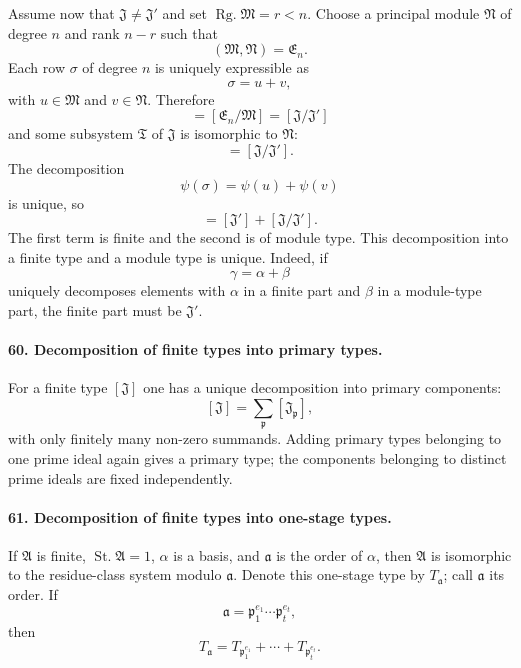 \documentclass[11pt]{article}
\newcommand{\Rg}{\operatorname{Rg.}}
\newcommand{\St}{\operatorname{St.}}
\begin{document}
Assume now that $\mathfrak J\ne\mathfrak J'$ and set $\Rg\mathfrak M=r<n$. Choose a principal module $\mathfrak N$ of degree $n$ and rank $n-r$ such that
\begin{equation}
  (\mathfrak M,\mathfrak N)=\mathfrak E_n.
\tag{99}
\end{equation}
Each row $\sigma$ of degree $n$ is uniquely expressible as
\begin{equation}
  \sigma=u+v,
\tag{100}
\end{equation}
with $u\in\mathfrak M$ and $v\in\mathfrak N$. Therefore
\begin{equation}
  [\mathfrak N]=[\mathfrak E_n/\mathfrak M]=[\mathfrak J/\mathfrak J']
\tag{101}
\end{equation}
and some subsystem $\mathfrak T$ of $\mathfrak J$ is isomorphic to $\mathfrak N$:
\begin{equation}
  [\mathfrak T]=[\mathfrak J/\mathfrak J'].
\tag{102}
\end{equation}
The decomposition
\begin{equation}
  \psi(\sigma)=\psi(u)+\psi(v)
\tag{103}
\end{equation}
is unique, so
\begin{equation}
  [\mathfrak J]=[\mathfrak J']+[\mathfrak J/\mathfrak J'].
\tag{104}
\end{equation}
The first term is finite and the second is of module type. This decomposition into a finite type and a module type is unique. Indeed, if
\begin{equation}
  \gamma=\alpha+\beta
\tag{105}
\end{equation}
uniquely decomposes elements with $\alpha$ in a finite part and $\beta$ in a module-type part, the finite part must be $\mathfrak J'$.

\paragraph{60. Decomposition of finite types into primary types.}
For a finite type $[\mathfrak J]$ one has a unique decomposition into primary components:
\[
  [\mathfrak J]=\sum_{\mathfrak p}[\mathfrak J_{\mathfrak p}],
\]
with only finitely many non-zero summands. Adding primary types belonging to one prime ideal again gives a primary type; the components belonging to distinct prime ideals are fixed independently.

\paragraph{61. Decomposition of finite types into one-stage types.}
If $\mathfrak A$ is finite, $\St\mathfrak A=1$, $\alpha$ is a basis, and $\mathfrak a$ is the order of $\alpha$, then $\mathfrak A$ is isomorphic to the residue-class system modulo $\mathfrak a$. Denote this one-stage type by $T_{\mathfrak a}$; call $\mathfrak a$ its order. If
\[
  \mathfrak a=\mathfrak p_1^{e_1}\cdots\mathfrak p_t^{e_t},
\]
then
\[
  T_{\mathfrak a}=T_{\mathfrak p_1^{e_1}}+\cdots+T_{\mathfrak p_t^{e_t}}.
\]
\end{document}
